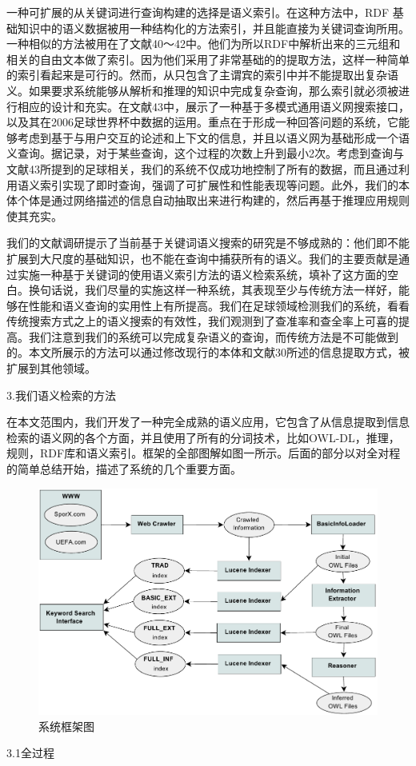 一种可扩展的从关键词进行查询构建的选择是语义索引。在这种方法中，{\Times RDF} 基础知识中的语义数据被用一种结构化的方法索引，并且能直接为关键词查询所用。一种相似的方法被用在了文献40～42中。他们为所以{\Times RDF}中解析出来的三元组和相关的自由文本做了索引。因为他们采用了非常基础的的提取方法，这样一种简单的索引看起来是可行的。然而，从只包含了主谓宾的索引中并不能提取出复杂语义。如果要求系统能够从解析和推理的知识中完成复杂查询，那么索引就必须被进行相应的设计和充实。在文献43中，展示了一种基于多模式通用语义网搜索接口，以及其在2006足球世界杯中数据的运用。重点在于形成一种回答问题的系统，它能够考虑到基于与用户交互的论述和上下文的信息，并且以语义网为基础形成一个语义查询。据记录，对于某些查询，这个过程的次数上升到最小2次。考虑到查询与文献43所提到的足球相关，我们的系统不仅成功地控制了所有的数据，而且通过利用语义索引实现了即时查询，强调了可扩展性和性能表现等问题。此外，我们的本体个体是通过网络描述的信息自动抽取出来进行构建的，然后再基于推理应用规则使其充实。

我们的文献调研提示了当前基于关键词语义搜索的研究是不够成熟的：他们即不能扩展到大尺度的基础知识，也不能在查询中捕获所有的语义。我们的主要贡献是通过实施一种基于关键词的使用语义索引方法的语义检索系统，填补了这方面的空白。换句话说，我们尽量的实施这样一种系统，其表现至少与传统方法一样好，能够在性能和语义查询的实用性上有所提高。我们在足球领域检测我们的系统，看看传统搜索方式之上的语义搜索的有效性，我们观测到了查准率和查全率上可喜的提高。我们注意到我们的系统可以完成复杂语义的查询，而传统方法是不可能做到的。本文所展示的方法可以通过修改现行的本体和文献30所述的信息提取方式，被扩展到其他领域。

3.我们语义检索的方法

在本文范围内，我们开发了一种完全成熟的语义应用，它包含了从信息提取到信息检索的语义网的各个方面，并且使用了所有的分词技术，比如{\Times OWL-DL}，推理，规则，{\Times RDF}库和语义索引。框架的全部图解如图一所示。后面的部分以对全对程的简单总结开始，描述了系统的几个重要方面。

	\begin{figure}[htbp] 
	\centering\includegraphics[width=5in]{fig/trans/fig1.png} 
	\caption[]{\xiaosihao 系统框架图}
	\end{figure} 
3.1全过程

